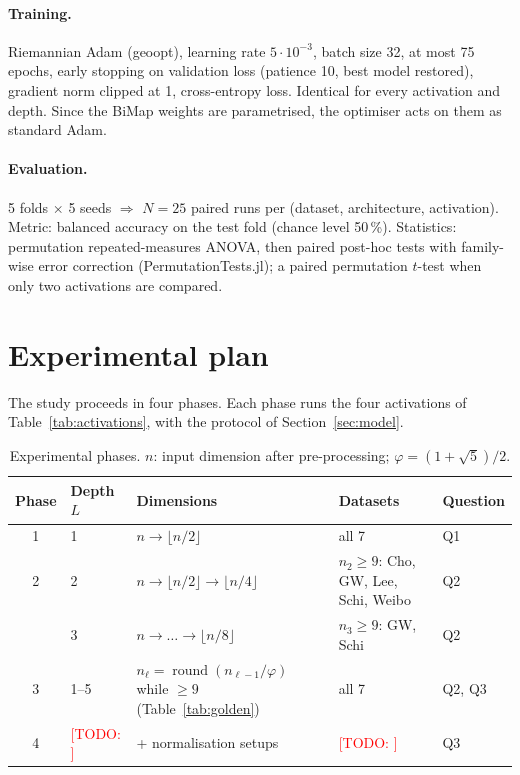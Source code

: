 \documentclass[11pt,a4paper]{article}
\newcommand{\todo}[1]{\textcolor{red}{[TODO: #1]}}
\begin{document}
\paragraph{Training.}
Riemannian Adam (geoopt), learning rate $5\cdot10^{-3}$, batch size 32, at most 75
epochs, early stopping on validation loss (patience 10, best model restored), gradient norm
clipped at 1, cross-entropy loss. Identical for every activation and depth.
Since the BiMap weights are parametrised, the optimiser acts on them as standard Adam.

\paragraph{Evaluation.}
5 folds $\times$ 5 seeds $\Rightarrow$ $N = 25$ paired runs per (dataset, architecture,
activation). Metric: balanced accuracy on the test fold (chance level 50\,\%). Statistics: permutation
repeated-measures ANOVA, then paired post-hoc tests with family-wise error correction
(PermutationTests.jl); a paired permutation $t$-test when only two activations are compared.

\section{Experimental plan}
\label{sec:plan}

The study proceeds in four phases. Each phase runs the four activations of
Table~\ref{tab:activations}, with the protocol of Section~\ref{sec:model}.

\begin{table}[h]
\centering
\caption{Experimental phases. $n$: input dimension after pre-processing;
$\varphi = (1+\sqrt5)/2$.}
\label{tab:plan}
\small
\begin{tabular}{clp{4.2cm}p{3.2cm}l}
\toprule
Phase & Depth $L$ & Dimensions & Datasets & Question \\
\midrule
1 & 1 & $n \to \lfloor n/2 \rfloor$                         & all 7 & Q1 \\
2 & 2 & $n \to \lfloor n/2 \rfloor \to \lfloor n/4 \rfloor$ & $n_2 \geq 9$: Cho, GW, Lee, Schi, Weibo & Q2 \\
  & 3 & $n \to \dots \to \lfloor n/8 \rfloor$               & $n_3 \geq 9$: GW, Schi & Q2 \\
3 & 1--5 & $n_\ell = \operatorname{round}(n_{\ell-1}/\varphi)$ while $\geq 9$ (Table~\ref{tab:golden}) & all 7 & Q2, Q3 \\
4 & \todo{} & + normalisation setups & \todo{} & Q3 \\
\bottomrule
\end{tabular}
\end{table}
\end{document}
